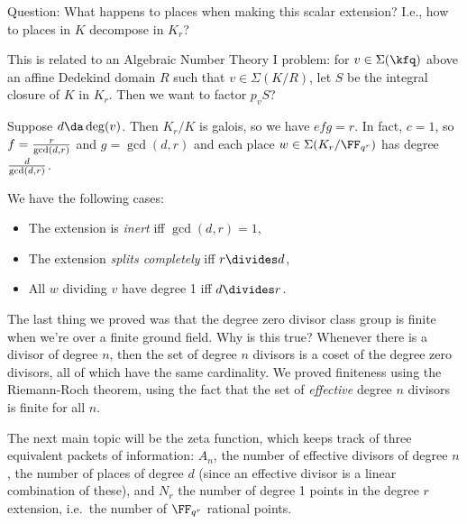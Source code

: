 Question: What happens to places when making this scalar extension?
I.e., how to places in \(K\) decompose in \(K_r\)?

\begin{remark}

This is related to an Algebraic Number Theory I problem: for
\(v\in \Sigma(\kfq)\) above an affine Dedekind domain \(R\) such that
\(v\in \Sigma(K/R)\), let \(S\) be the integral closure of \(K\) in
\(K_r\). Then we want to factor \(p_v S\)?

\end{remark}

\begin{lemma}

Suppose \(d\da \deg(v)\). Then \(K_r/K\) is galois, so we have
\(efg=r\). In fact, \(c=1\), so \(f = {r\over \gcd(d, r)}\) and
\(g = \gcd(d, r)\) and each place \(w\in \Sigma(K_r / \FF_{q^r})\) has
degree \({d\over \gcd(d, r)}\).

\end{lemma}

\begin{remark}

We have the following cases:

\begin{itemize}
\item
  The extension is \emph{inert} iff \(\gcd(d, r) = 1\),
\item
  The extension \emph{splits completely} iff \(r\divides d\),
\item
  All \(w\) dividing \(v\) have degree 1 iff \(d\divides r\).
\end{itemize}

\end{remark}

The last thing we proved was that the degree zero divisor class group is
finite when we're over a finite ground field. Why is this true? Whenever
there is a divisor of degree \(n\), then the set of degree \(n\)
divisors is a coset of the degree zero divisors, all of which have the
same cardinality. We proved finiteness using the Riemann-Roch theorem,
using the fact that the set of \emph{effective} degree \(n\) divisors is
finite for all \(n\).

The next main topic will be the zeta function, which keeps track of
three equivalent packets of information: \(A_n\), the number of
effective divisors of degree \(n\), the number of places of degree \(d\)
(since an effective divisor is a linear combination of these), and
\(N_r\) the number of degree 1 points in the degree \(r\) extension,
i.e.~the number of \(\FF_{q^r}\) rational points.

